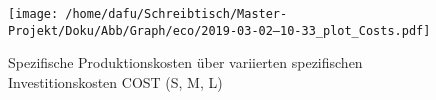 \documentclass[onecolumn,10pt,titlepage]{article}
\begin{document}
\begin{figure}[H]
	
	\centering
	\texttt{[image: /home/dafu/Schreibtisch/Master-Projekt/Doku/Abb/Graph/eco/2019-03-02--10-33\_plot\_Costs.pdf]}
	\caption[Spezifische Produktionskosten; variierte Investitionskosten COST]{Spezifische Produktionskosten über variierten spezifischen Investitionskosten COST (S, M, L)}
	\label{fig:analy_ecoVAls_COST} 
\end{figure}




%
%
%
%
\end{document}
